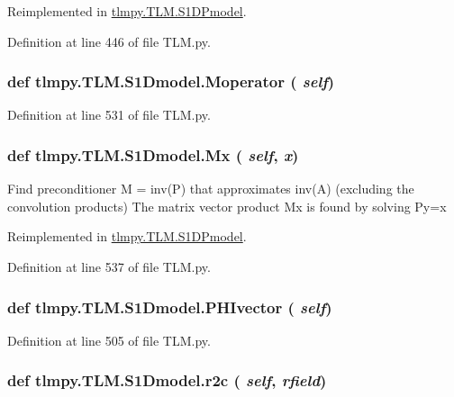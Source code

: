 Reimplemented in \hyperlink{classtlmpy_1_1TLM_1_1S1DPmodel_aa97f1c73493df12a52fd044ce03369ca}{tlmpy.TLM.S1DPmodel}.

Definition at line 446 of file TLM.py.\hypertarget{classtlmpy_1_1TLM_1_1S1Dmodel_a432538079bce4289b0010e6c54fab704}{
\subsubsection[{Moperator}]{\setlength{\rightskip}{0pt plus 5cm}def tlmpy.TLM.S1Dmodel.Moperator ( {\em self})}}
\label{classtlmpy_1_1TLM_1_1S1Dmodel_a432538079bce4289b0010e6c54fab704}


Definition at line 531 of file TLM.py.\hypertarget{classtlmpy_1_1TLM_1_1S1Dmodel_ac118c2a6c1b74be47a69631685b2f549}{
\subsubsection[{Mx}]{\setlength{\rightskip}{0pt plus 5cm}def tlmpy.TLM.S1Dmodel.Mx ( {\em self}, \/   {\em x})}}
\label{classtlmpy_1_1TLM_1_1S1Dmodel_ac118c2a6c1b74be47a69631685b2f549}
\begin{DoxyVerb}
Find preconditioner M = inv(P) that approximates inv(A)
(excluding the convolution products)
The matrix vector product Mx is found by solving Py=x
\end{DoxyVerb}
 

Reimplemented in \hyperlink{classtlmpy_1_1TLM_1_1S1DPmodel_a8a3c8c4f7ed27896039af1f9779c1383}{tlmpy.TLM.S1DPmodel}.

Definition at line 537 of file TLM.py.\hypertarget{classtlmpy_1_1TLM_1_1S1Dmodel_acc595bd9fe2d0b1ff601bd0dfd2ae8af}{
\subsubsection[{PHIvector}]{\setlength{\rightskip}{0pt plus 5cm}def tlmpy.TLM.S1Dmodel.PHIvector ( {\em self})}}
\label{classtlmpy_1_1TLM_1_1S1Dmodel_acc595bd9fe2d0b1ff601bd0dfd2ae8af}


Definition at line 505 of file TLM.py.\hypertarget{classtlmpy_1_1TLM_1_1S1Dmodel_ad028ddba88644279700b0004ab4b6894}{
\subsubsection[{r2c}]{\setlength{\rightskip}{0pt plus 5cm}def tlmpy.TLM.S1Dmodel.r2c ( {\em self}, \/   {\em rfield})}}
\label{classtlmpy_1_1TLM_1_1S1Dmodel_ad028ddba88644279700b0004ab4b6894}


